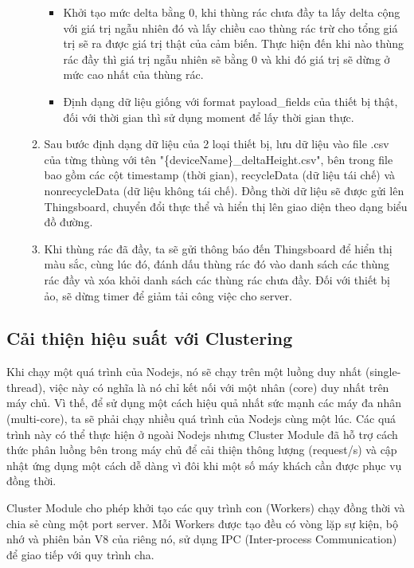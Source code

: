 \begin{itemize}
\begin{enumerate}
\begin{itemize}
            \item Khởi tạo mức delta bằng 0, khi thùng rác chưa đầy ta lấy delta cộng với giá trị ngẫu nhiên đó và lấy chiều cao thùng rác trừ cho tổng giá trị sẽ ra được giá trị thật của cảm biến. Thực hiện đến khi nào thùng rác đầy thì giá trị ngẫu nhiên sẽ bằng 0 và khi đó giá trị sẽ dừng ở mức cao nhất của thùng rác.  
            \item Định dạng dữ liệu giống với format payload\_fields của thiết bị thật, đối với thời gian thì sử dụng moment để lấy thời gian thực. 
        \end{itemize}
        \item Sau bước định dạng dữ liệu của 2 loại thiết bị, lưu dữ liệu vào file .csv của từng thùng với tên "\{deviceName\}\_deltaHeight.csv", bên trong file bao gồm các cột timestamp (thời gian), recycleData (dữ liệu tái chế) và nonrecycleData (dữ liệu không tái chế). Đồng thời dữ liệu sẽ được gửi lên Thingsboard, chuyển đổi thực thể và hiển thị lên giao diện theo dạng biểu đồ đường.
        \item Khi thùng rác đã đầy, ta sẽ gửi thông báo đến Thingsboard để hiển thị màu sắc, cùng lúc đó, đánh dấu thùng rác đó vào danh sách các thùng rác đầy và xóa khỏi danh sách các thùng rác chưa đầy. Đối với thiết bị ảo, sẽ dừng timer để giảm tải công việc cho server.
    \end{enumerate}
\end{itemize}

\subsection{Cải thiện hiệu suất với Clustering}
Khi chạy một quá trình của Nodejs, nó sẽ chạy trên một luồng duy nhất (single-thread), việc này có nghĩa là nó chỉ kết nối với một nhân (core) duy nhất trên máy chủ. Vì thế, để sử dụng một cách hiệu quả nhất sức mạnh các máy đa nhân (multi-core), ta sẽ phải chạy nhiều quá trình của Nodejs cùng một lúc. Các quá trình này có thể thực hiện ở ngoài Nodejs nhưng Cluster Module đã hỗ trợ cách thức phân luồng bên trong máy chủ để cải thiện thông lượng (request/s) và cập nhật ứng dụng một cách dễ dàng vì đôi khi một số máy khách cần được phục vụ đồng thời.

Cluster Module cho phép khởi tạo các quy trình con (Workers) chạy đồng thời và chia sẻ cùng một port server. Mỗi Workers được tạo đều có vòng lặp sự kiện, bộ nhớ và phiên bản V8 của riêng nó, sử dụng IPC (Inter-process Communication) để giao tiếp với quy trình cha.


